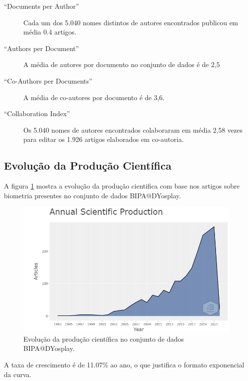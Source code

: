 \begin{description}
    \item [``Documents per Author''] Cada um dos 5.040 nomes distintos de autores encontrados publicou em média 0.4 artigos.
    
    \item [``Authors per Document''] A média de autores por documento no conjunto de dados é de 2,5
    
    \item [``Co-Authors per Documents''] A média de co-autores por documento é de 3,6.
    
    \item [``Collaboration Index''] Os 5.040 nomes de autores encontrados colaboraram em média 2,58 vezes para editar os  1.926 artigos elaborados em co-autoria.
    
\end{description}

\subsection{Evolução da Produção Científica}
\label{DYosplay_prodcient}
A figura \ref{fig:evol:anual:BIPA@DYosplay} mostra a evolução da produção cientifica com base nos artigos sobre biometria presentes no conjunto de dados BIPA@DYosplay.

\begin{figure}[H]
    \centering
    \includegraphics[width=1\textwidth]{experiments/DYosplay/PesquisaBibliometrica/Imagens/BIPA@DYosplay_Annual Scientific Production.png}
    \caption{Evolução da produção científica no conjunto de dados BIPA@DYosplay.}
    \label{fig:evol:anual:BIPA@DYosplay}
\end{figure}

A taxa de crescimento é de 11.07\% ao ano, o que justifica o formato exponencial da curva.

